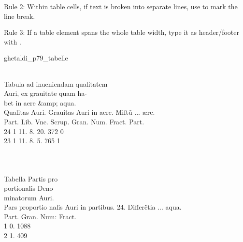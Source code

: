 \vspace{3mm}
\begin{mainrule}
Rule 2: Within table cells, if text is broken into separate lines, use  to mark the line break.
\end{mainrule}

\vspace{3mm}
\begin{mainruleLessImportant}
Rule 3: If a table element spans the whole table width, type it as header/footer with .
\end{mainruleLessImportant}

\begin{sampleImage}{ghetaldi_p79_tabelle}

\begin{typeLatin}
 \\
Tabula ad inueniendam qualitatem  \\
Auri, ex grauitate quam ha-  \\
bet in aere &amp; aqua.  \\
Qualitas  Auri.  Grauitas Auri \lwr in aere.  Miſt\~u ... ære. \\
Part.  Lib.  Vnc.  Scrup. \lwr{} Gran.  Num. Fract.  Part. \\
24  1  11.  8. \lwr{} 20.  372  0 \\
23  1  11.  8. \lwr{} 5.  765  1 \\
\someText \\
 \\
 \\
Tabella Partis pro  \\
portionalis Deno-  \\
minatorum Auri. \\
Pars proportio  nalis Auri in  partibus. 24. \lwr{} Differ\~etia ... aqua. \\
Part.  Gran.  Num: Fract. \\
1  0.  1088 \\
2  1.  409 \\
\someText \\
 \\
\end{typeLatin}


\end{sampleImage}

